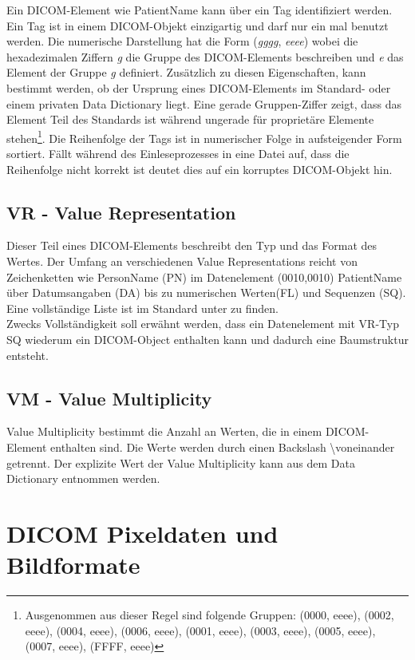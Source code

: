 Ein DICOM-Element wie PatientName kann über ein Tag identifiziert werden. Ein Tag ist in einem DICOM-Objekt einzigartig und darf nur ein mal benutzt werden. Die numerische Darstellung hat die Form (\textit{gggg}, \textit{eeee}) wobei die hexadezimalen Ziffern \textit{g} die Gruppe des DICOM-Elements beschreiben und \textit{e} das Element der Gruppe \textit{g} definiert. Zusätzlich zu diesen Eigenschaften, kann bestimmt werden, ob der Ursprung eines DICOM-Elements im Standard- oder einem privaten Data Dictionary liegt. Eine gerade Gruppen-Ziffer zeigt, dass das Element Teil des Standards ist während ungerade für proprietäre Elemente stehen\footnote{Ausgenommen aus dieser Regel sind folgende Gruppen: (0000, eeee), (0002, eeee), (0004, eeee), (0006, eeee), (0001, eeee), (0003, eeee), (0005, eeee), (0007, eeee), (FFFF, eeee)}\cite[7.1]{dicom:structure}. Die Reihenfolge der Tags ist in numerischer Folge in aufsteigender Form sortiert. Fällt während des Einleseprozesses in eine Datei auf, dass die Reihenfolge nicht korrekt ist deutet dies auf ein korruptes DICOM-Objekt hin.\\

\subsection{VR - Value Representation}
Dieser Teil eines DICOM-Elements beschreibt den Typ und das Format des Wertes\cite[6.2]{dicom:structure}. Der Umfang an verschiedenen Value Representations reicht von Zeichenketten wie PersonName (PN) im Datenelement (0010,0010) PatientName über Datumsangaben (DA) bis zu numerischen Werten(FL) und Sequenzen (SQ). Eine vollständige Liste ist im Standard unter \cite[Table 6.2.1]{dicom:structure} zu finden.\\
Zwecks Vollständigkeit soll erwähnt werden, dass ein Datenelement mit VR-Typ SQ wiederum ein DICOM-Object enthalten kann und dadurch eine Baumstruktur entsteht.

\subsection{VM - Value Multiplicity}
Value Multiplicity bestimmt die Anzahl an Werten, die in einem DICOM-Element enthalten sind. Die Werte werden durch einen Backslash \textbackslash voneinander getrennt. Der explizite Wert der Value Multiplicity kann aus dem Data Dictionary entnommen werden.\cite[6.4]{dicom:structure}

\section{DICOM Pixeldaten und Bildformate}

